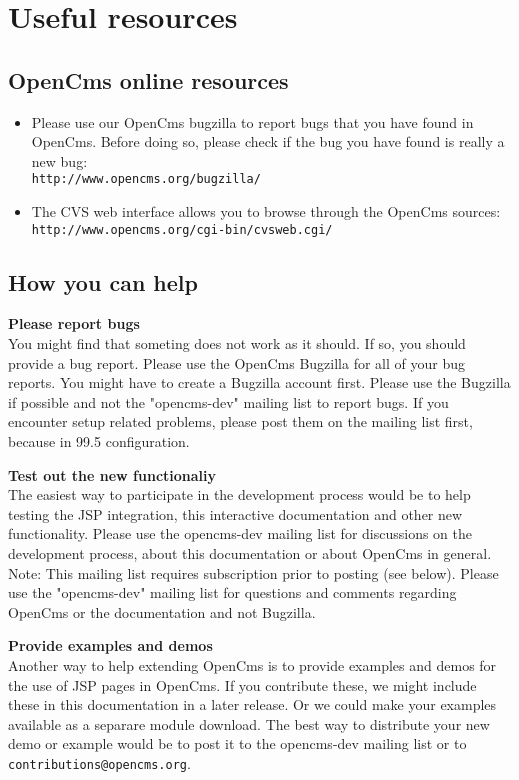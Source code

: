 \chapter{Useful resources}

\section{OpenCms online resources}

\begin{itemize}
\item Please use our OpenCms bugzilla to report bugs that you have found in OpenCms. 
Before doing so, please check if the bug you have found is really a new bug:\\
{\tt http://www.opencms.org/bugzilla/}
\item The CVS web interface allows you to browse through the OpenCms sources:\\
{\tt http://www.opencms.org/cgi-bin/cvsweb.cgi/}
\end{itemize}

\section{How you can help}
{\bf Please report bugs}\\
You might find that someting does not work as it should. If so, you should provide a bug report. 
Please use the OpenCms Bugzilla for all of your bug reports. You might have to create a Bugzilla 
account first. Please use the Bugzilla if possible and not the "opencms-dev" mailing list to report 
bugs. If you encounter setup related problems, please post them on the mailing list first, because 
in 99.5%
configuration. 

{\bf Test out the new functionaliy}\\
The easiest way to participate in the development process would be to help testing the JSP integration, 
this interactive documentation and other new functionality. Please use the opencms-dev mailing list for 
discussions on the development process, about this documentation or about OpenCms in general. Note: This 
mailing list requires subscription prior to posting (see below). Please use the "opencms-dev" mailing list 
for questions and comments regarding OpenCms or the documentation and not Bugzilla.

{\bf Provide examples and demos}\\
Another way to help extending OpenCms is to provide examples and demos for the use of JSP pages in OpenCms. 
If you contribute these, we might include these in this documentation in a later release. Or we could make 
your examples available as a separare module download. The best way to distribute your new demo or example 
would be to post it to the opencms-dev mailing list or to {\tt contributions@opencms.org}.

